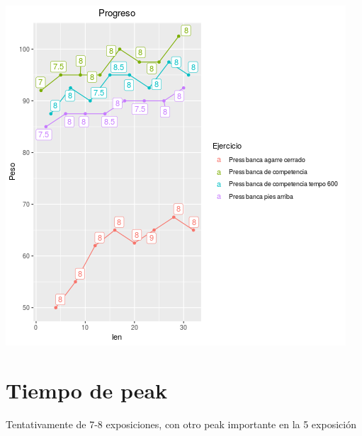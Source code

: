 \documentclass[11pt]{article}
\begin{document}
\begin{center}
\includegraphics[width=.9\linewidth]{tmp.png}
\end{center}

\section{Tiempo de peak}
\label{sec:org173d43d}
Tentativamente de 7-8 exposiciones, con otro peak importante en la 5 exposición
\end{document}
